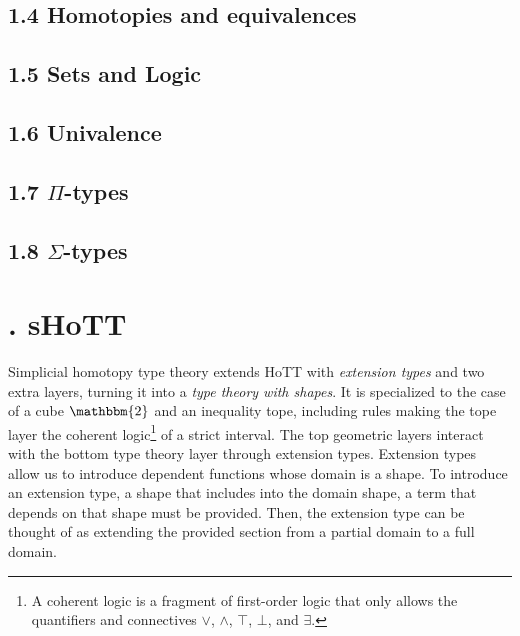 \documentclass{article}
\theoremstyle{named}
\theoremstyle{remark}
\theoremstyle{definition}
\begin{document}
\subsection*{1.4 Homotopies and equivalences}



\subsection*{1.5 Sets and Logic}


\subsection*{1.6 Univalence}


\subsection*{1.7 $\Pi$-types}


\subsection*{1.8 $\Sigma$-types}


\newpage

\section*{. sHoTT}
\setcounter{section}{2}
\setcounter{equation}{0}
\setcounter{theorem}{0}
\setcounter{subsection}{1}

Simplicial homotopy type theory extends HoTT with \textit{extension types} and two extra layers, turning it into a
 \textit{type theory with shapes}. It is specialized to the case of a cube $\mathbbm{2}$ and an inequality tope, including rules making the tope layer the coherent logic\footnote{A coherent logic is a fragment of first-order logic that only allows the quantifiers and connectives $\lor$, $\land$, $\top$, $\bot$, and $\exists$.} of a strict interval. The top geometric layers interact with the bottom type theory layer
 through extension types. Extension types allow us to introduce dependent functions whose domain is a shape. To introduce an extension type, a shape that includes into the domain shape, a term that depends on that shape must be provided. Then, the extension
 type can be thought of as extending the provided section from a partial domain to a full domain. 
\end{document}

